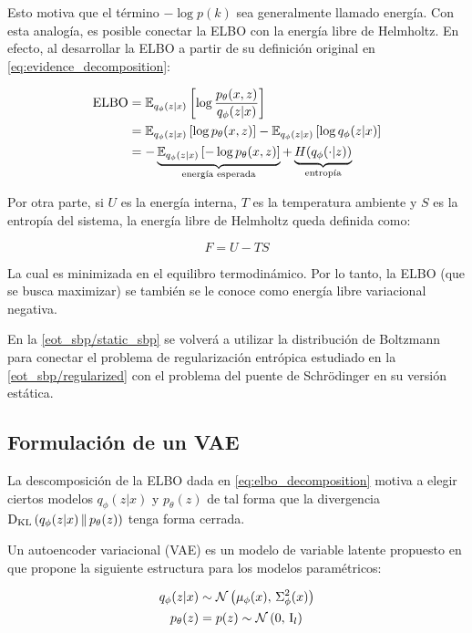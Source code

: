 Esto motiva que el término $-\log p(k)$ sea generalmente llamado energía. Con esta analogía, es posible conectar la ELBO con la energía libre de Helmholtz. En efecto, al desarrollar la ELBO a partir de su definición original en \eqref{eq:evidence_decomposition}:

\begin{align}
	\operatorname{ELBO} &= \mathbb{E}_{q_\phi(z|x)}\left[\log\frac{p_\theta(x,z)}{q_\phi(z|x)}\right]\\
    & = \mathbb{E}_{q_\phi(z|x)}\left[\log p_\theta(x,z)\right] - \mathbb{E}_{q_\phi(z|x)}\left[\log q_\phi(z|x)\right] \\
	& = -\underbrace{\mathbb{E}_{q_\phi(z|x)}\left[-\log p_\theta(x,z)\right]}_{\text{energía esperada}} + \underbrace{H(q_\phi(\cdot|z))}_{\text{entropía}}
\end{align}

Por otra parte, si $U$ es la energía interna, $T$ es la temperatura ambiente y $S$ es la entropía del sistema, la energía libre de Helmholtz queda definida como:

\begin{equation}
	F = U-TS
\end{equation}

La cual es minimizada en el equilibro termodinámico. Por lo tanto, la ELBO (que se busca maximizar) se también se le conoce como energía libre variacional negativa.


En la \autoref{eot_sbp/static_sbp} se volverá a utilizar la distribución de Boltzmann para conectar el problema de regularización entrópica estudiado en la \autoref{eot_sbp/regularized} con el problema del puente de Schrödinger en su versión estática.

\subsection{Formulación de un VAE}
\label{dm/vae/formulation}

La descomposición de la ELBO dada en \eqref{eq:elbo_decomposition} motiva a elegir ciertos modelos $q_\phi(z|x)$ y $p_\theta(z)$ de tal forma que la divergencia $\operatorname{D_{KL}}\left(q_\phi(z|x)\,\|\,p_\theta(z)\right)$ tenga forma cerrada.

Un autoencoder variacional (VAE) es un modelo de variable latente propuesto en \cite{kingma2022autoencoding} que propone la siguiente estructura para los modelos paramétricos:

\begin{align}
    q_\phi(z|x) & \sim \mathcal{N}\left(\mu_\phi(x),\,\Sigma^2_\phi(x)\right) \label{eq:vae_model_posterior} \\
    p_\theta(z) & = p(z) \sim \mathcal{N}\left(0,\,\operatorname{I}_{l}\right) \label{eq:vae_model_prior}
\end{align}

